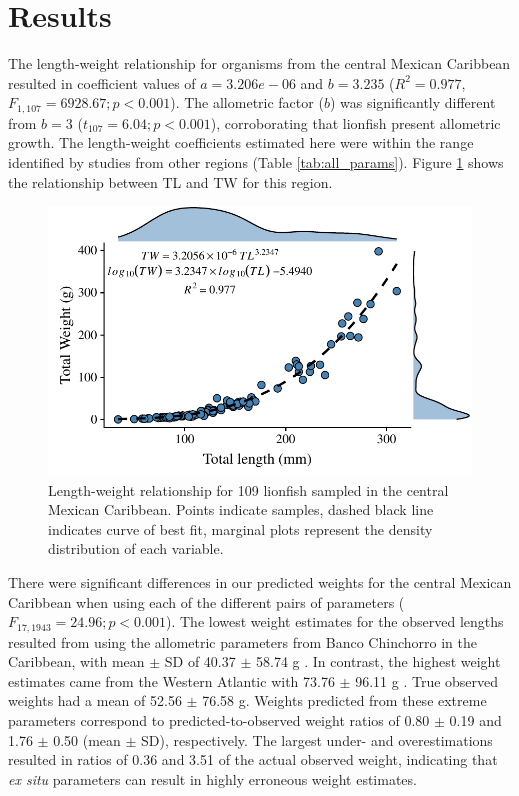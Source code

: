 \documentclass[fleqn,10pt,lineno]{wlpeerj} %
\begin{document}
\section*{Results}

The length-weight relationship for organisms from the central Mexican
Caribbean resulted in coefficient values of \(a = 3.206e-06\) and
\(b = 3.235\) (\(R^2 = 0.977\), \(F_{1, 107} = 6928.67; p < 0.001\)).
The allometric factor (\(b\)) was significantly different from \(b = 3\)
(\(t_{107} = 6.04; p<0.001\)), corroborating that lionfish present
allometric growth. The length-weight coefficients estimated here were
within the range identified by studies from other regions (Table
\ref{tab:all_params}). Figure \ref{fig:l-w-carib} shows the relationship
between TL and TW for this region.

\begin{figure}
\centering
\includegraphics{Manuscript_files/figure-latex/fit1-1.pdf}
\caption{\label{fig:l-w-carib}Length-weight relationship for 109
lionfish sampled in the central Mexican Caribbean. Points indicate
samples, dashed black line indicates curve of best fit, marginal plots
represent the density distribution of each variable.}
\end{figure}

There were significant differences in our predicted weights for the
central Mexican Caribbean when using each of the different pairs of
parameters (\(F_{17, 1943} = 24.96; p < 0.001\)). The lowest weight
estimates for the observed lengths resulted from using the allometric
parameters from Banco Chinchorro in the Caribbean, with mean \(\pm\) SD
of 40.37 \(\pm\) 58.74 g \citep{sabidoitz_2016}. In contrast, the
highest weight estimates came from the Western Atlantic with 73.76
\(\pm\) 96.11 g \citep{barbour_2011}. True observed weights had a mean
of 52.56 \(\pm\) 76.58 g. Weights predicted from these extreme
parameters correspond to predicted-to-observed weight ratios of 0.80
\(\pm\) 0.19 and 1.76 \(\pm\) 0.50 (mean \(\pm\) SD), respectively. The
largest under- and overestimations resulted in ratios of 0.36 and 3.51
of the actual observed weight, indicating that \emph{ex situ} parameters
can result in highly erroneous weight estimates.
\end{document}
